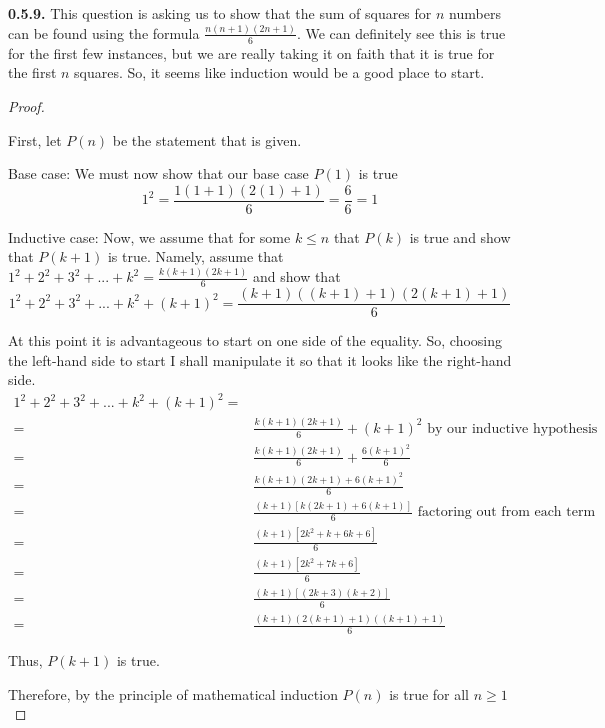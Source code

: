 \documentclass[12pt,]{book}
\theoremstyle{plain}
\theoremstyle{definition}
\theoremstyle{definition}
\theoremstyle{definition}
\numberwithin{equation}{chapter}
\newcommand{\amp}{&}
\begin{document}
\par\smallskip
\noindent\textbf{0.5.9.} \hypertarget{p-464}{}%
This question is asking us to show that the sum of squares for \(n\) numbers can be found using the formula \(\frac{n(n+1)(2n+1)}{6}\). We can definitely see this is true for the first few instances, but we are really taking it on faith that it is true for the first \(n\) squares. So, it seems like induction would be a good place to start.%
\begin{proof}\hypertarget{proof-12}{}
\hypertarget{p-465}{}%
First, let \(P(n)\) be the statement that is given.%
\par
\hypertarget{p-466}{}%
Base case: We must now show that our base case \(P(1)\) is true%
\begin{equation*}
1^2 = \frac{1(1+1)(2(1)+1)}{6} = \frac{6}{6} =1
\end{equation*}
%
\par
\hypertarget{p-467}{}%
Inductive case: Now, we assume that for some \(k\leq n\) that \(P(k)\) is true and show that \(P(k+1)\) is true. Namely, assume that \(1^2 +2^2 +3^2+...+k^2 = \frac{k(k+1)(2k+1)}{6}\) and show that%
\begin{equation*}
1^2 +2^2 +3^2+...+k^2+{(k+1)}^2 = \frac{(k+1)((k+1)+1)(2(k+1)+1)}{6}
\end{equation*}
%
\par
\hypertarget{p-468}{}%
At this point it is advantageous to start on one side of the equality. So, choosing the left-hand side to start I shall manipulate it so that it looks like the right-hand side.%
\begin{align*}
1^2 +2^2 +3^2+...+k^2+{(k+1)}^2 =\\
= \amp \frac{k(k+1)(2k+1)}{6} +(k+1)^2 \mbox{ by our inductive hypothesis}\\
= \amp \frac{k(k+1)(2k+1)}{6} +\frac{6(k+1)^2}{6}\\
= \amp \frac{k(k+1)(2k+1)+6(k+1)^2}{6}\\
= \amp \frac{(k+1)[k(2k+1)+6(k+1)]}{6} \mbox{ factoring out  from each term}\\
= \amp \frac{(k+1)[2k^2+k+6k+6]}{6}\\
= \amp \frac{(k+1)[2k^2+7k+6]}{6}\\
= \amp \frac{(k+1)[(2k+3)(k+2)]}{6}\\
= \amp \frac{(k+1)(2(k+1)+1)((k+1)+1)}{6}
\end{align*}
%
\par
\hypertarget{p-469}{}%
Thus, \(P(k+1)\) is true.%
\par
\hypertarget{p-470}{}%
Therefore, by the principle of mathematical induction \(P(n)\) is true for all \(n \geq 1\)%
\end{proof}
\end{document}

